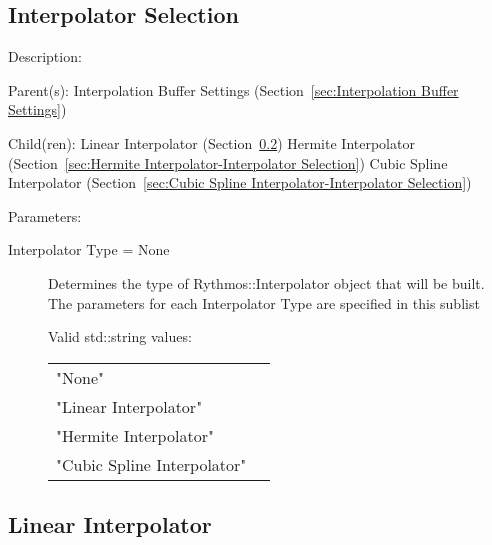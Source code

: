 \subsection{Interpolator Selection}
\label{sec:Interpolator Selection-Interpolation Buffer Settings}

\begin{list}{}
  {\setlength{\leftmargin}{1.0in}
   \setlength{\labelwidth}{0.75in}
   \setlength{\labelsep}{0.125in}}
  \item[Description:]
  \item[Parent(s):]
    Interpolation Buffer Settings (Section~\ref{sec:Interpolation Buffer Settings})
  \item[Child(ren):]
    Linear Interpolator (Section~\ref{sec:Linear Interpolator-Interpolator Selection})
      \newline 
    Hermite Interpolator (Section~\ref{sec:Hermite Interpolator-Interpolator Selection})
      \newline 
    Cubic Spline Interpolator (Section~\ref{sec:Cubic Spline Interpolator-Interpolator Selection})
  \item[Parameters:]
    \begin{description}
      \item[Interpolator Type = None] 
Determines the type of Rythmos::Interpolator object that will be built.
The parameters for each Interpolator Type are specified in this sublist

  Valid std::string values:

      \begin{tabular}{lp{}}
      "None" & \\ 
      "Linear Interpolator" & \\ 
      "Hermite Interpolator" & \\ 
      "Cubic Spline Interpolator" & \\ 
      \end{tabular}
\end{description}

\end{list}

\subsection{Linear Interpolator}
\label{sec:Linear Interpolator-Interpolator Selection}

